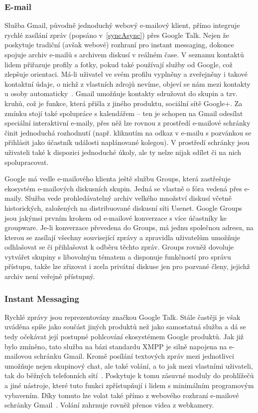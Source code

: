\documentclass[12pt,oneside,final]{fithesis2}
\begin{document}
\subsubsection*{E-mail}
Služba Gmail, původně jednoduchý webový e-mailový klient, přímo integruje rychlé zasílání zpráv (popsáno v~\ref{syncAsync}) přes Google Talk. Nejen že poskytuje tradiční (avšak webové) rozhraní pro instant messaging, dokonce spojuje archiv e-mailů s archivem diskusí v reálném čase. V seznamu kontaktů lidem přiřazuje profily a fotky, pokud také používají služby od Google, což zlepšuje orientaci. Má-li uživatel ve svém profilu vyplněny a zveřejněny i takové kontaktní údaje, o nichž z vlastních zdrojů nevíme, objeví se nám mezi kontakty u osoby automaticky~\cite{striebeck2010gmail}. Gmail umožňuje kontakty sdružovat do skupin a tzv. kruhů, což je funkce, která přišla z jiného produktu, sociální sítě Google+. Za zmínku stojí také spolupráce s kalendářem -- ten je schopen na Gmail odesílat speciální interaktivní e-maily, přes něž lze rovnou z prostředí e-mailové schránky činit jednoduchá rozhodnutí (např. kliknutím na odkaz v e-mailu s pozvánkou se přihlásit jako účastník události naplánované kolegou). V prostředí schránky jsou uživateli také k dispozici jednoduché úkoly, ale ty nelze nijak sdílet či na nich spolupracovat.

Google má vedle e-mailového klienta ještě službu Groups, která zastřešuje ekosystém e-mailových diskusních skupin. Jedná se vlastně o fóra vedená přes e-maily. Služba vede prohledávatelný archiv velkého množství diskusí včetně historických, založených na distribuované diskusní síti Usenet. Google Groups jsou jakýmsi prvním krokem od e-mailové konverzace s více účastníky ke groupware. Je-li konverzace převedena do Groups, má jednu společnou adresu, na kterou se zasílají všechny související zprávy a zpravidla uživatelům umožňuje odhlašovat se či přihlašovat k odběru těchto zpráv. Groups rovněž dovoluje vytvářet skupiny s libovolným tématem a disponuje funkčností pro správu přístupu, takže lze zřizovat i zcela privátní diskuse jen pro pozvané členy, jejichž archiv není veřejně přístupný.

\subsubsection*{Instant Messaging}
Rychlé zprávy jsou reprezentovány značkou Google Talk. Stále častěji je však uváděna spíše jako součást jiných produktů než jako samostatná služba a dá se tedy očekávat její postupné pohlcování ekosystémem Google produktů. Jak již bylo zmíněno, tato služba na bázi standardu XMPP je silně napojena na e-mailovou schránku Gmail. Kromě posílání textových zpráv mezi jednotlivci umožňuje nejen skupinový chat, ale také volání, a to jak mezi vlastními uživateli, tak do běžných telefonních sítí~\cite{teague2010making}. Poskytuje k tomu zásuvné moduly do prohlížečů a jiné nástroje, které tuto funkci zpřístupňují i lidem s minimálním programovým vybavením. Díky tomuto lze volat také přímo z webového rozhraní e-mailové schránky Gmail~\cite{schriebman2010call}. Volání zahrnuje rovněž přenos videa z webkamery.
\end{document}

